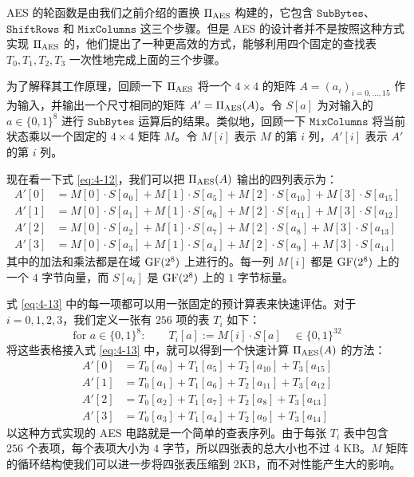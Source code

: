 \begin{snote}
AES 的轮函数是由我们之前介绍的置换 $\Pi_{\rm AES}$ 构建的，它包含 $\mathtt{SubBytes}$、$\mathtt{ShiftRows}$ 和 $\mathtt{MixColumns}$ 这三个步骤。但是 AES 的设计者并不是按照这种方式实现 $\Pi_{\rm AES}$ 的，他们提出了一种更高效的方式，能够利用四个固定的查找表 $T_0,T_1,T_2,T_3$ 一次性地完成上面的三个步骤。

为了解释其工作原理，回顾一下 $\Pi_{\rm AES}$ 将一个 $4\times4$ 的矩阵 $A=(a_i)_{i=0,\dots,15}$ 作为输入，并输出一个尺寸相同的矩阵 $A'=\Pi_{\rm AES}(A)$。令 $S[a]$ 为对输入的 $a\in\{0,1\}^8$ 进行 $\mathtt{SubBytes}$ 运算后的结果。类似地，回顾一下 $\mathtt{MixColumns}$ 将当前状态乘以一个固定的 $4\times4$ 矩阵 $M$。令 $M[i]$ 表示 $M$ 的第 $i$ 列，$A'[i]$ 表示 $A'$ 的第 $i$ 列。

现在看一下式 \ref{eq:4-12}，我们可以把 $\Pi_{\rm AES}(A)$ 输出的四列表示为：
\begin{equation}\label{eq:4-13}
	\begin{aligned}
		A'[0] & = M[0]\cdot S[a_0]+M[1]\cdot S[a_5]+M[2]\cdot S[a_{10}]+M[3]\cdot S[a_{15}]\\ 
		A'[1] & = M[0]\cdot S[a_1]+M[1]\cdot S[a_6]+M[2]\cdot S[a_{11}]+M[3]\cdot S[a_{12}]\\ 
		A'[2] & = M[0]\cdot S[a_2]+M[1]\cdot S[a_7]+M[2]\cdot S[a_8]+M[3]\cdot S[a_{13}] \\ 
		A'[3] & = M[0]\cdot S[a_3]+M[1]\cdot S[a_4]+M[2]\cdot S[a_9]+M[3]\cdot S[a_{14}]
	\end{aligned}
\end{equation}
其中的加法和乘法都是在域 ${\rm GF}(2^8)$ 上进行的。每一列 $M[i]$ 都是 ${\rm GF}(2^8)$ 上的一个 $4$ 字节向量，而 $S[a_i]$ 是 ${\rm GF}(2^8)$ 上的 $1$ 字节标量。

式 \ref{eq:4-13} 中的每一项都可以用一张固定的预计算表来快速评估。对于 $i=0,1,2,3$，我们定义一张有 $256$ 项的表 $T_i$ 如下：
\[
\text{for }a\in\{0,1\}^8:\quad\quad
T_i[a]:=M[i]\cdot S[a]\quad\in\{0,1\}^{32}
\]
将这些表格接入式 \ref{eq:4-13} 中，就可以得到一个快速计算 $\Pi_{\rm AES}(A)$ 的方法：
\[
\begin{aligned}
A'[0] & = T_0[a_0]+T_1[a_5]+T_2[a_{10}]+T_3[a_{15}]\\
A'[1] & = T_0[a_1]+T_1[a_6]+T_2[a_{11}]+T_3[a_{12}]\\
A'[2] & = T_0[a_2]+T_1[a_7]+T_2[a_8]+T_3[a_{13}]\\
A'[3] & = T_0[a_3]+T_1[a_4]+T_2[a_9]+T_3[a_{14}]
\end{aligned}
\]
以这种方式实现的 AES 电路就是一个简单的查表序列。由于每张 $T_i$ 表中包含 $256$ 个表项，每个表项大小为 $4$ 字节，所以四张表的总大小也不过 4 KB。$M$ 矩阵的循环结构使我们可以进一步将四张表压缩到 2KB，而不对性能产生大的影响。


\end{snote}
